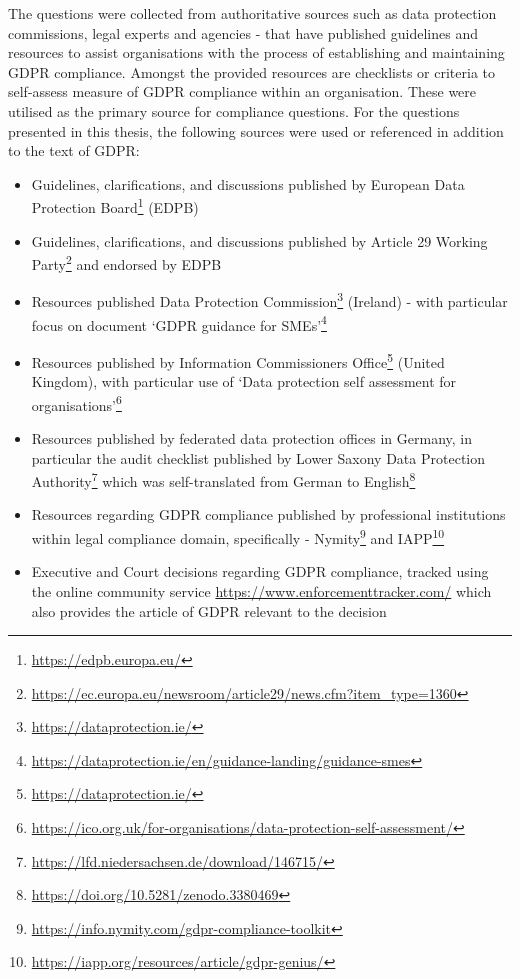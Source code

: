 The questions were collected from authoritative sources such as data protection commissions, legal experts and agencies - that have published guidelines and resources to assist organisations with the process of establishing and maintaining GDPR compliance.
Amongst the provided resources are checklists or criteria to self-assess measure of GDPR compliance within an organisation. These were utilised as the primary source for compliance questions.
For the questions presented in this thesis, the following sources were used or referenced in addition to the text of GDPR:
\begin{itemize}
    \item Guidelines, clarifications, and discussions published by European Data Protection Board\footnote{\url{https://edpb.europa.eu/}} (EDPB)
    \item Guidelines, clarifications, and discussions published by Article 29 Working Party\footnote{\url{https://ec.europa.eu/newsroom/article29/news.cfm?item_type=1360}} and endorsed by EDPB
    \item Resources published Data Protection Commission\footnote{\url{https://dataprotection.ie/}} (Ireland) - with particular focus on document `GDPR guidance for SMEs'\footnote{\url{https://dataprotection.ie/en/guidance-landing/guidance-smes}}
    \item Resources published by Information Commissioners Office\footnote{\url{https://dataprotection.ie/}} (United Kingdom), with particular use of `Data protection self assessment for organisations'\footnote{\url{https://ico.org.uk/for-organisations/data-protection-self-assessment/}}
    \item Resources published by federated data protection offices in Germany, in particular the audit checklist published by Lower Saxony Data Protection Authority\footnote{\url{https://lfd.niedersachsen.de/download/146715/}} which was self-translated from German to English\footnote{\url{https://doi.org/10.5281/zenodo.3380469}}
    \item Resources regarding GDPR compliance published by professional institutions within legal compliance domain, specifically - Nymity\footnote{\url{https://info.nymity.com/gdpr-compliance-toolkit}} and IAPP\footnote{\url{https://iapp.org/resources/article/gdpr-genius/}}
    \item Executive and Court decisions regarding GDPR compliance, tracked using the online community service \url{https://www.enforcementtracker.com/} which also provides the article of GDPR relevant to the decision
\end{itemize}


